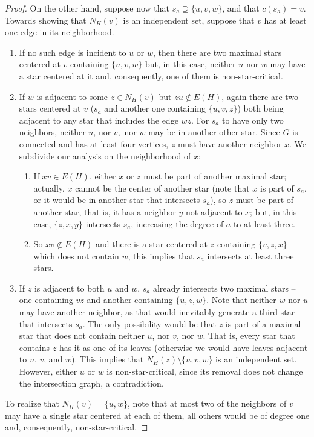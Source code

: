 \begin{proof}
   On the other hand, suppose now that $s_a \supseteq \{u,v,w\}$, and that $c(s_a) = v$.
   Towards showing that $N_H(v)$ is an independent set, suppose that $v$ has at least one edge in its neighborhood.
   \begin{enumerate}\addtocounter{enumi}{2}
       \item If no such edge is incident to $u$ or $w$, then there are two maximal stars centered at $v$ containing $\{u,v,w\}$ but, in this case, neither $u$ nor $w$ may have a star centered at it and, consequently, one of them is non-star-critical. 
       \item If $w$ is adjacent to some $z \in N_H(v)$ but $zu \notin E(H)$, again there are two stars centered at $v$ ($s_a$ and another one containing $\{u,v,z\}$) both being adjacent to any star that includes the edge $wz$.
       For $s_a$ to have only two neighbors, neither $u$, nor $v,$ nor $w$ may be in another other star.
       Since $G$ is connected and has at least four vertices, $z$ must have another neighbor $x$.
       We subdivide our analysis on the neighborhood of $x$:
       \begin{enumerate}
            \item If $xv \in E(H)$, either $x$ or $z$ must be part of another maximal star; actually, $x$ cannot be the center of another star (note that $x$ is part of $s_a$, or it would be in another star that intersects $s_a$), so $z$ must be part of another star, that is, it has a neighbor $y$ not adjacent to $x$; but, in this case, $\{z,x,y\}$ intersects $s_a$, increasing the degree of $a$ to at least three.
            \item So $xv \notin E(H)$ and there is a star centered at $z$ containing $\{v,z,x\}$ which does not contain $w$, this implies that $s_a$ intersects at least three stars.
       \end{enumerate}
       \item If $z$ is adjacent to both $u$ and $w$, $s_a$ already intersects two maximal stars -- one containing $vz$ and another containing $\{u,z,w\}$.
       Note that neither $w$ nor $u$ may have another neighbor, as that would inevitably generate a third star that intersects $s_a$.
       The only possibility would be that $z$ is part of a maximal star that does not contain neither $u$, nor $v$, nor $w$.
       That is, every star that contains $z$ has it as one of its leaves (otherwise we would have leaves adjacent to $u$, $v$, and $w$).
       This implies that $N_H(z) \setminus \{u,v,w\}$ is an independent set.
       However, either $u$ or $w$ is non-star-critical, since its removal does not change the intersection graph, a contradiction.
   \end{enumerate}
   To realize that $N_H(v) = \{u,w\}$, note that at most two of the neighbors of $v$ may have a single star centered at each of them, all others would be of degree one and, consequently, non-star-critical.
   

\end{proof}
